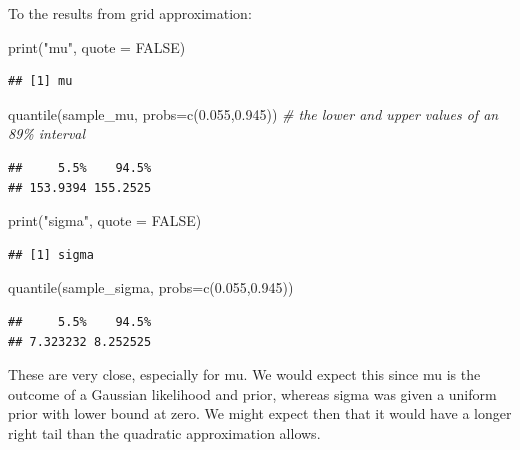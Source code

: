 \documentclass[
]{book}
\newenvironment{Shaded}{\begin{snugshade}}{\end{snugshade}}
\newcommand{\AttributeTok}[1]{\textcolor[rgb]{0.77,0.63,0.00}{#1}}
\newcommand{\CommentTok}[1]{\textcolor[rgb]{0.56,0.35,0.01}{\textit{#1}}}
\newcommand{\ConstantTok}[1]{\textcolor[rgb]{0.00,0.00,0.00}{#1}}
\newcommand{\FloatTok}[1]{\textcolor[rgb]{0.00,0.00,0.81}{#1}}
\newcommand{\FunctionTok}[1]{\textcolor[rgb]{0.00,0.00,0.00}{#1}}
\newcommand{\NormalTok}[1]{#1}
\newcommand{\StringTok}[1]{\textcolor[rgb]{0.31,0.60,0.02}{#1}}
\begin{document}
To the results from grid approximation:

\begin{Shaded}
\begin{Highlighting}[]
\FunctionTok{print}\NormalTok{(}\StringTok{"mu"}\NormalTok{, }\AttributeTok{quote =} \ConstantTok{FALSE}\NormalTok{)}
\end{Highlighting}
\end{Shaded}

\begin{verbatim}
## [1] mu
\end{verbatim}

\begin{Shaded}
\begin{Highlighting}[]
\FunctionTok{quantile}\NormalTok{(sample\_mu, }\AttributeTok{probs=}\FunctionTok{c}\NormalTok{(}\FloatTok{0.055}\NormalTok{,}\FloatTok{0.945}\NormalTok{)) }\CommentTok{\# the lower and upper values of an 89\% interval}
\end{Highlighting}
\end{Shaded}

\begin{verbatim}
##     5.5%    94.5% 
## 153.9394 155.2525
\end{verbatim}

\begin{Shaded}
\begin{Highlighting}[]
\FunctionTok{print}\NormalTok{(}\StringTok{"sigma"}\NormalTok{, }\AttributeTok{quote =} \ConstantTok{FALSE}\NormalTok{)}
\end{Highlighting}
\end{Shaded}

\begin{verbatim}
## [1] sigma
\end{verbatim}

\begin{Shaded}
\begin{Highlighting}[]
\FunctionTok{quantile}\NormalTok{(sample\_sigma, }\AttributeTok{probs=}\FunctionTok{c}\NormalTok{(}\FloatTok{0.055}\NormalTok{,}\FloatTok{0.945}\NormalTok{))}
\end{Highlighting}
\end{Shaded}

\begin{verbatim}
##     5.5%    94.5% 
## 7.323232 8.252525
\end{verbatim}

These are very close, especially for mu. We would expect this since mu is the outcome of a Gaussian likelihood and prior, whereas sigma was given a uniform prior with lower bound at zero. We might expect then that it would have a longer right tail than the quadratic approximation allows.
\end{document}
